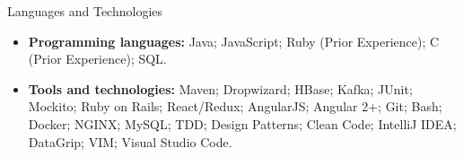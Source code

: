 \documentclass[]{mcdowellcv}
\begin{document}
	\begin{cvsection}{Languages and Technologies}
		\begin{cvsubsection}{}{}{}	
			\begin{itemize}
				\item \textbf{Programming languages:} Java; JavaScript; Ruby (Prior Experience); C (Prior Experience); SQL.
				\item \textbf{Tools and technologies:} Maven; Dropwizard; HBase; Kafka; JUnit; Mockito; Ruby on Rails; React/Redux; AngularJS; Angular 2+; Git; Bash; Docker; NGINX; MySQL; TDD; Design Patterns; Clean Code; IntelliJ IDEA; DataGrip; VIM; Visual Studio Code.
			\end{itemize}
		\end{cvsubsection}
	\end{cvsection}
	
\end{document}
